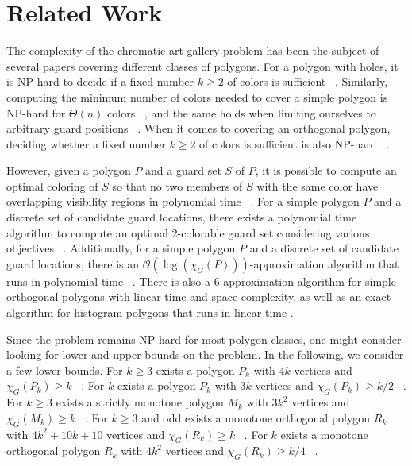\section{Related Work}
The complexity of the chromatic art gallery problem has been the subject of several papers covering different classes of polygons.
For a polygon with holes, it is NP-hard to decide if a fixed number $k \geq 2$ of colors is sufficient ~\cite{fekete2014complexity}. Similarly, computing the minimum number of colors needed to cover a simple polygon is NP-hard for $\Theta(n)$ colors ~\cite{fekete2014complexity}, and the same holds when limiting ourselves to arbitrary guard positions ~\cite{fekete2014chromatic}. When it comes to covering an orthogonal polygon, deciding whether a fixed number $k \geq 2$ of colors is sufficient is also NP-hard ~\cite{hoorfar2021np}.\par\noindent
However, given a polygon $P$ and a guard set $S$ of $P$, it is possible to compute an optimal coloring of $S$ so that no two members of $S$ with the same color have overlapping visibility regions in polynomial time ~\cite{erickson2011many}. For a simple polygon $P$ and a discrete set of candidate guard locations, there exists a polynomial time algorithm to compute an optimal $2$-colorable guard set considering various objectives ~\cite{fekete2014chromatic}. Additionally, for a simple polygon $P$ and a discrete set of candidate guard locations, there is an $\mathcal{O}(\log (\chi_G(P)))$-approximation algorithm that runs in polynomial time ~\cite{fekete2014chromatic}. There is also a $6$-approximation algorithm for simple orthogonal polygons with linear time and space complexity, as well as an exact algorithm for histogram polygons that runs in linear time \cite{hoorfar2021np}.\par\noindent
Since the problem remains NP-hard for most polygon classes, one might consider looking for lower and upper bounds on the problem.
In the following, we consider a few lower bounds.
For $k \geq 3$ exists a polygon $P_k$ with $4k$ vertices and $\chi_G(P_k) \geq k$ ~\cite{erickson2012art}.
For $k$ exists a polygon $P_k$ with $3k$ vertices and $\chi_G(P_k) \geq k/2$ ~\cite{bartschi2011coloring}.
For $k \geq 3$ exists a strictly monotone polygon $M_k$ with $3k^2$ vertices and $\chi_G(M_k) \geq k$ ~\cite{erickson2012art}.
For $k \geq 3$ and odd exists a monotone orthogonal polygon $R_k$ with $4k^2 + 10k + 10$ vertices and $\chi_G(R_k) \geq k$ ~\cite{erickson2012art}.
For $k$ exists a monotone orthogonal polygon $R_k$ with $4k^2$ vertices and $\chi_G(R_k) \geq k/4$ ~\cite{bartschi2011coloring}.\par\noindent
